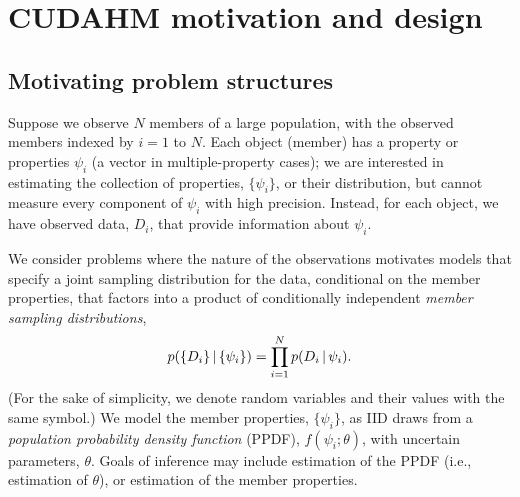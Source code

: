 \section{CUDAHM motivation and design}
\label{sec:design}

\subsection{Motivating problem structures}
\label{sec:motiv}

Suppose we observe $N$ members of a large population, with the observed members indexed by $i=1$ to $N$.
Each object (member) has a property or properties $\psi_i$ (a vector in multiple-property cases); we are interested in estimating the collection of properties, $\{\psi_i\}$, or their distribution, but cannot measure every component of $\psi_i$ with high precision.
Instead, for each object, we have observed data, $D_i$, that provide information about $\psi_i$.

We consider problems where the nature of the observations motivates models that specify a joint sampling distribution for the data, conditional on the member properties, that factors into a product of conditionally independent \emph{member sampling distributions},
\begin{equation}
p(\{D_i\} \,|\, \{\psi_i\}) = \prod_{i=1}^N p(D_i \,|\, \psi_i).
\label{data-joint-member}
\end{equation}
(For the sake of simplicity, we denote random variables and their values with the same symbol.)
We model the member properties, $\{\psi_i\}$, as IID draws from a \emph{population probability density function} (PPDF), $f(\psi_i;\theta)$, with uncertain parameters, $\theta$.
Goals of inference may include estimation of the PPDF (i.e., estimation of $\theta$), or estimation of the member properties.

